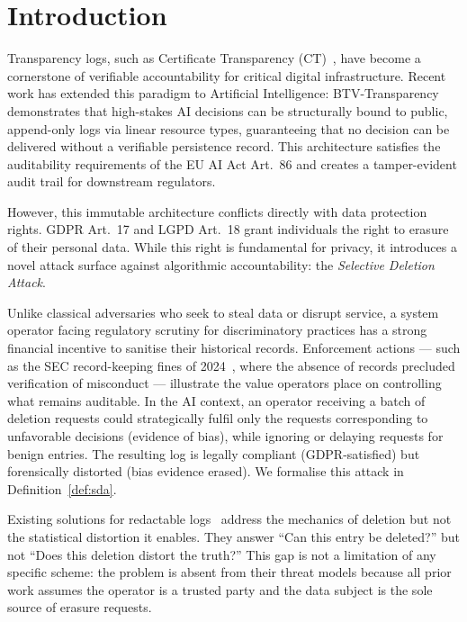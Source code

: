 \section{Introduction}
\label{sec:intro}

Transparency logs, such as Certificate Transparency (CT)~\cite{rfc6962},
have become a cornerstone of verifiable accountability for critical digital
infrastructure. Recent work has extended this paradigm to Artificial
Intelligence: BTV-Transparency~\cite{btv-t-repo} demonstrates that
high-stakes AI decisions can be structurally bound to public, append-only
logs via linear resource types, guaranteeing that no decision can be
delivered without a verifiable persistence record. This architecture
satisfies the auditability requirements of the EU AI Act Art.~86 and
creates a tamper-evident audit trail for downstream regulators.

However, this immutable architecture conflicts directly with data
protection rights. GDPR Art.~17 and LGPD Art.~18 grant individuals the
right to erasure of their personal data. While this right is fundamental
for privacy, it introduces a novel attack surface against algorithmic
accountability: the \emph{Selective Deletion Attack}.

Unlike classical adversaries who seek to steal data or disrupt service,
a system operator facing regulatory scrutiny for discriminatory practices
has a strong financial incentive to sanitise their historical records.
Enforcement actions --- such as the SEC record-keeping fines of
2024~\cite{sec-fines-2024}, where the absence of records precluded
verification of misconduct --- illustrate the value operators place on
controlling what remains auditable. In the AI context, an operator
receiving a batch of deletion requests could strategically fulfil only
the requests corresponding to unfavorable decisions (evidence of bias),
while ignoring or delaying requests for benign entries. The resulting
log is legally compliant (GDPR-satisfied) but forensically distorted
(bias evidence erased). We formalise this attack in
Definition~\ref{def:sda}.

Existing solutions for redactable logs~\cite{ateniese2017,deuber2019}
address the mechanics of deletion but not the statistical distortion
it enables. They answer ``Can this entry be deleted?'' but not ``Does
this deletion distort the truth?'' This gap is not a limitation of any
specific scheme: the problem is absent from their threat models because
all prior work assumes the operator is a trusted party and the data
subject is the sole source of erasure requests.

